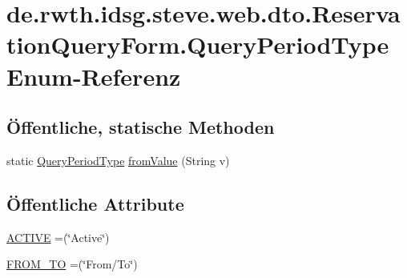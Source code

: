 \hypertarget{enumde_1_1rwth_1_1idsg_1_1steve_1_1web_1_1dto_1_1_reservation_query_form_1_1_query_period_type}{\section{de.\-rwth.\-idsg.\-steve.\-web.\-dto.\-Reservation\-Query\-Form.\-Query\-Period\-Type Enum-\/\-Referenz}
\label{enumde_1_1rwth_1_1idsg_1_1steve_1_1web_1_1dto_1_1_reservation_query_form_1_1_query_period_type}
}
\subsection*{Öffentliche, statische Methoden}
\begin{DoxyCompactItemize}
\item 
static \hyperlink{enumde_1_1rwth_1_1idsg_1_1steve_1_1web_1_1dto_1_1_reservation_query_form_1_1_query_period_type}{Query\-Period\-Type} \hyperlink{enumde_1_1rwth_1_1idsg_1_1steve_1_1web_1_1dto_1_1_reservation_query_form_1_1_query_period_type_afa1f2dc25b86e1a977cf63a251d26bf3}{from\-Value} (String v)
\end{DoxyCompactItemize}
\subsection*{Öffentliche Attribute}
\begin{DoxyCompactItemize}
\item 
\hyperlink{enumde_1_1rwth_1_1idsg_1_1steve_1_1web_1_1dto_1_1_reservation_query_form_1_1_query_period_type_a775d5731727cbdda2f9cba8b51a4ca5a}{A\-C\-T\-I\-V\-E} =(\char`\"{}Active\char`\"{})
\item 
\hyperlink{enumde_1_1rwth_1_1idsg_1_1steve_1_1web_1_1dto_1_1_reservation_query_form_1_1_query_period_type_a44ca90614a7a7c041d770c226171a9e7}{F\-R\-O\-M\-\_\-\-T\-O} =(\char`\"{}From/To\char`\"{})
\end{DoxyCompactItemize}


